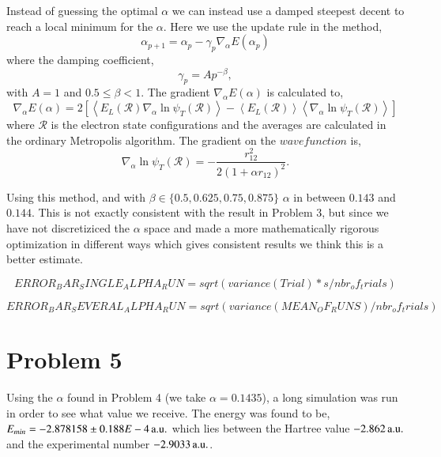 Instead of guessing the optimal $\alpha$ we can instead use a damped steepest decent to reach a local minimum for the $\alpha$. Here we use the update rule in the method,
\begin{equation}
\alpha_{p+1} = \alpha_p-\gamma_p \nabla_\alpha E(\alpha_p)
\end{equation} 
where the damping coefficient,
\begin{equation}
\gamma_p=Ap^{-\beta},
\end{equation}
with $A=1$ and $0.5\leq\beta < 1$. The gradient $\nabla_\alpha E(\alpha)$ is calculated to,
\begin{equation}
\nabla_\alpha E(\alpha) = 2\left[\left<E_L(\mathcal{R})\nabla_\alpha \ln{\psi_T(\mathcal{R})}\right>-\left<E_L(\mathcal{R})\right>\left<\nabla_\alpha\ln{\psi_T(\mathcal{R})}\right>\right]
\end{equation}
where $\mathcal{R}$ is the electron state configurations and the averages are calculated in the ordinary Metropolis algorithm. The gradient on the $wave function $ is,
\begin{equation}
\nabla_\alpha \ln{\psi_T(\mathcal{R})} = -\frac{r_{12}^2}{2(1+\alpha r_{12})^2}.
\end{equation}

Using this method, and with $\beta \in \{0.5,0.625,0.75,0.875\}$ $\alpha$ in between $0.143$ and $0.144$. This is not exactly consistent with the result in Problem 3, but since we have not discretiziced the $\alpha$ space and made a more mathematically rigorous optimization in different ways which gives consistent results we think this is a better estimate.



\begin{equation}
ERROR_BAR_SINGLE_ALPHA_RUN = sqrt(variance(Trial)*s/nbr_of_trials)
\end{equation}

\begin{equation}
ERROR_BAR_SEVERAL_ALPHA_RUN = sqrt(variance(MEAN_OF_RUNS)/nbr_of_trials)
\end{equation}

\section*{Problem 5}

Using the $\alpha$ found in Problem 4 (we take $\alpha=0.1435$), a long simulation was run in order to see what value we receive. The energy was found to be, $E_{min}=\unit[-2.878158\pm 0.188E-4]{a.u.}$ which lies between the Hartree value $\unit[-2.862]{a.u.}$ and the experimental number $\unit[-2.9033]{a.u.}$.

